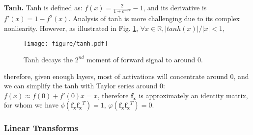 \documentclass[10pt,journal,compsoc]{IEEEtran}
\begin{document}
\textbf{Tanh. }Tanh is defined as: $f(x)=\frac{2}{1+e^{-2x}}-1$, and its derivative is $f'(x)=1 - f^2(x)$. Analysis of tanh is more challenging due to its complex nonliearity. However, as illustrated in Fig. \ref{fig:tanh}, $\forall x\in\mathbb{R},|tanh(x)|/|x|<1$, 
\begin{figure}[ht]
\centering
\texttt{[image: figure/tanh.pdf]}
\caption{Tanh decays the $2^{nd}$ moment of forward signal to around 0.}
\label{fig:tanh}
\end{figure}
therefore, given enough layers, most of activations will concentrate around 0, and we can simplify the tanh with Taylor series around $0$: $f(x)\approx f(0)+f'(0)x=x$, therefore $\mathbf{f_x}$ is approximately an identity matrix, for whom we have $\phi(\mathbf{f_xf_x}^T)=1$, $\varphi(\mathbf{f_xf_x}^T)=0$.

\subsubsection{Linear Transforms}\label{proof:linear_transform}
\end{document}
